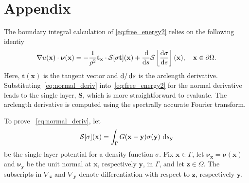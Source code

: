 \documentclass[prb,preprint,showpacs,preprintnumbers,amsmath,amssymb,longbibliography]{revtex4-1}
\newcommand{\DD}{\mathcal{D}}
\newcommand{\SSS}{\mathcal{S}}
\newcommand{\nnu}{\boldsymbol{\nu}}
\renewcommand{\SS}{\mathbf{S}}
\newcommand{\xx}{\mathbf{x}}
\newcommand{\zz}{\mathbf{z}}
\newcommand{\yy}{\mathbf{y}}
\renewcommand{\tt}{\mathbf{t}}
\begin{document}
\section{Appendix}
\label{sec:appendix}
The boundary integral calculation
of \ref{eq:free_energy2} relies
on the following identiy 
%
\begin{equation}
\label{eq:normal_deriv}
\nabla u(\xx) \cdot \nnu(\xx)=
-\frac{1}{\rho^2} {\bf t}_\xx\cdot \SSS[\sigma{\bf t}](\xx)
+ \frac{\dif}{\dif s}\SSS\left[\frac{\dif \sigma}{\dif s}\right](\xx), \quad \xx \in \partial \Omega.
\end{equation}
%
Here, $\tt(\xx)$ is the tangent vector and $\dif/\dif s$ is the
arclength derivative.
Substituting~\eqref{eq:normal_deriv}
into~\eqref{eq:free_energy2} for the normal derivative leads to the
single layer, $\SS$, which is more straightforward to evaluate.
The arclength derivative is computed using
the spectrally accurate Fourier transform.

To prove ~\eqref{eq:normal_deriv}, let
\begin{equation}
  \label{eq:SLP}
  \mathcal{S}[\sigma](\xx) = \int_\Gamma G(\xx-\yy) \sigma(\yy)\, \dif s_\yy
\end{equation}
be the single layer potential for a density function $\sigma.$ Fix $\xx
\in \Gamma$, let $\nnu_{\xx} = \nnu(\xx)$ and $\nnu_{\yy}$ be the unit
normal at $\xx$, respectively $\yy$, in $\Gamma$, and let $\zz \in
\Omega$. The subscripts in $\nabla_{\zz}$ and $\nabla_{\yy}$ denote
differentiation with respect to $\zz$, respectively $\yy$.
\end{document}
